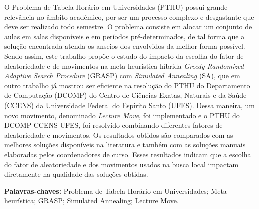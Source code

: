 \documentclass[
	12pt,				%
	openright,			%
	oneside,			%
	a4paper,			%
	english,			%
	french,				%
	spanish,			%
	brazil				%
	]{abntex2}
\begin{document}


\setlength{\absparsep}{18pt}
\begin{resumo}
O Problema de Tabela-Horário em Universidades (PTHU) possui grande relevância no âmbito acadêmico, por ser um processo complexo e desgastante que deve ser realizado todo semestre. O problema consiste em alocar um conjunto de aulas em salas disponíveis e em períodos pré-determinados, de tal forma que a solução encontrada atenda os anseios dos envolvidos da melhor forma possível. Sendo assim, este trabalho propõe o estudo do impacto da escolha do fator de aleatoriedade e de movimentos na meta-heurística híbrida \textit{Greedy Randomized Adaptive Search Procedure} (GRASP) com \textit{Simulated Annealing} (SA), que em outro trabalho já mostrou ser eficiente na resolução do PTHU do Departamento de Computação (DCOMP) do Centro de Ciências Exatas, Naturais e da Saúde (CCENS) da Universidade Federal do Espírito Santo (UFES). Dessa maneira, um novo movimento, denominado \textit{Lecture Move}, foi implementado e o PTHU do DCOMP-CCENS-UFES, foi resolvido combinando diferentes fatores de aleatoriedade e movimentos. Os resultados obtidos são comparados com as melhores soluções disponíveis na literatura e também com as soluções manuais elaboradas pelos coordenadores de curso. Esses resultados indicam que a escolha do fator de aleatoriedade e dos movimentos usados na busca local impactam diretamente na qualidade das soluções obtidas.

\textbf{Palavras-chaves:} Problema de Tabela-Horário em Universidades; Meta-heurística; GRASP; Simulated Annealing; Lecture Move.

\end{resumo}
\end{document}
